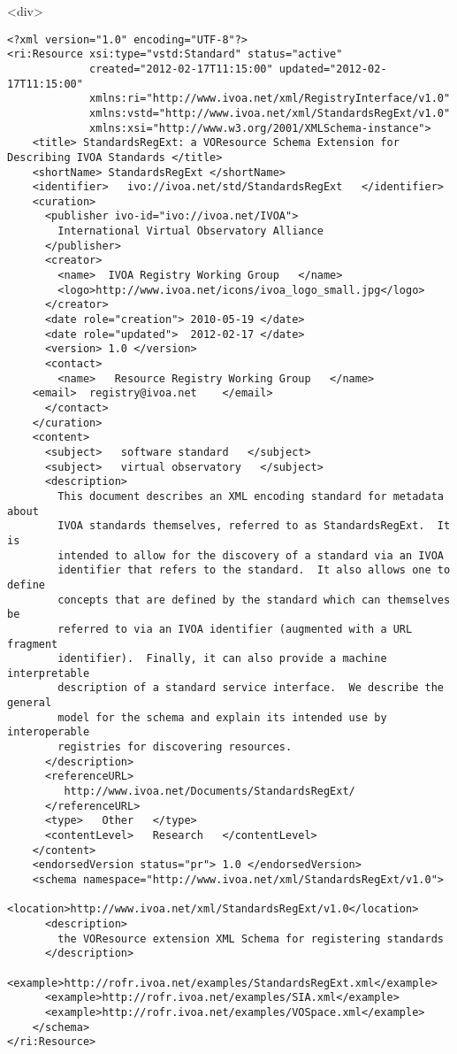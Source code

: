 \documentclass[11pt,a4paper]{ivoa}
\begin{document}
{{<div>
\begin{verbatim}<?xml version="1.0" encoding="UTF-8"?>
<ri:Resource xsi:type="vstd:Standard" status="active"
             created="2012-02-17T11:15:00" updated="2012-02-17T11:15:00"
             xmlns:ri="http://www.ivoa.net/xml/RegistryInterface/v1.0" 
             xmlns:vstd="http://www.ivoa.net/xml/StandardsRegExt/v1.0" 
             xmlns:xsi="http://www.w3.org/2001/XMLSchema-instance">
    <title> StandardsRegExt: a VOResource Schema Extension for Describing IVOA Standards </title>
    <shortName> StandardsRegExt </shortName>
    <identifier>   ivo://ivoa.net/std/StandardsRegExt   </identifier>
    <curation>
      <publisher ivo-id="ivo://ivoa.net/IVOA">
        International Virtual Observatory Alliance
      </publisher>
      <creator>
        <name>  IVOA Registry Working Group   </name>
        <logo>http://www.ivoa.net/icons/ivoa_logo_small.jpg</logo>
      </creator>
      <date role="creation"> 2010-05-19 </date>
      <date role="updated">  2012-02-17 </date>
      <version> 1.0 </version>
      <contact>
        <name>   Resource Registry Working Group   </name>
	<email>  registry@ivoa.net    </email>
      </contact>
    </curation>
    <content>
      <subject>   software standard   </subject>
      <subject>   virtual observatory   </subject>
      <description>
        This document describes an XML encoding standard for metadata about
        IVOA standards themselves, referred to as StandardsRegExt.  It is
        intended to allow for the discovery of a standard via an IVOA
        identifier that refers to the standard.  It also allows one to define
        concepts that are defined by the standard which can themselves be
        referred to via an IVOA identifier (augmented with a URL fragment
        identifier).  Finally, it can also provide a machine interpretable
        description of a standard service interface.  We describe the general
        model for the schema and explain its intended use by interoperable
        registries for discovering resources. 
      </description>
      <referenceURL>
         http://www.ivoa.net/Documents/StandardsRegExt/
      </referenceURL>
      <type>   Other   </type>
      <contentLevel>   Research   </contentLevel>
    </content>
    <endorsedVersion status="pr"> 1.0 </endorsedVersion>
    <schema namespace="http://www.ivoa.net/xml/StandardsRegExt/v1.0">
      <location>http://www.ivoa.net/xml/StandardsRegExt/v1.0</location>
      <description>
        the VOResource extension XML Schema for registering standards
      </description>
      <example>http://rofr.ivoa.net/examples/StandardsRegExt.xml</example>
      <example>http://rofr.ivoa.net/examples/SIA.xml</example>
      <example>http://rofr.ivoa.net/examples/VOSpace.xml</example>
    </schema>
</ri:Resource>
\end{verbatim}

}}
\end{document}
